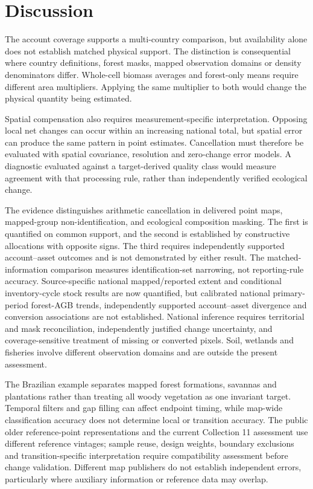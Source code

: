 \documentclass[11pt,a4paper]{article}
\begin{document}
\section{Discussion}
The account coverage supports a multi-country comparison, but availability alone does not establish matched physical support. The distinction is consequential where country definitions, forest masks, mapped observation domains or density denominators differ. Whole-cell biomass averages and forest-only means require different area multipliers. Applying the same multiplier to both would change the physical quantity being estimated.

Spatial compensation also requires measurement-specific interpretation. Opposing local net changes can occur within an increasing national total, but spatial error can produce the same pattern in point estimates. Cancellation must therefore be evaluated with spatial covariance, resolution and zero-change error models. A diagnostic evaluated against a target-derived quality class would measure agreement with that processing rule, rather than independently verified ecological change.

The evidence distinguishes arithmetic cancellation in delivered point maps, mapped-group non-identification, and ecological composition masking. The first is quantified on common support, and the second is established by constructive allocations with opposite signs. The third requires independently supported account--asset outcomes and is not demonstrated by either result. The matched-information comparison measures identification-set narrowing, not reporting-rule accuracy. Source-specific national mapped/reported extent and conditional inventory-cycle stock results are now quantified, but calibrated national primary-period forest-AGB trends, independently supported account--asset divergence and conversion associations are not established. National inference requires territorial and mask reconciliation, independently justified change uncertainty, and coverage-sensitive treatment of missing or converted pixels. Soil, wetlands and fisheries involve different observation domains and are outside the present assessment.

The Brazilian example separates mapped forest formations, savannas and plantations rather than treating all woody vegetation as one invariant target. Temporal filters and gap filling can affect endpoint timing, while map-wide classification accuracy does not determine local or transition accuracy. The public older reference-point representations and the current Collection 11 assessment use different reference vintages; sample reuse, design weights, boundary exclusions and transition-specific interpretation require compatibility assessment before change validation. Different map publishers do not establish independent errors, particularly where auxiliary information or reference data may overlap.
\end{document}
